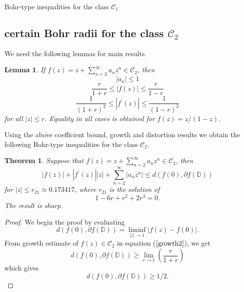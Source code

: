 \documentclass[12pt,a4paper,reqno]{amsart}
\theoremstyle{definition}
\theoremstyle{plain}
\newtheorem{theorem}[definition]{Theorem}
\newtheorem{lemma}[definition]{Lemma}
\numberwithin{equation}{section}
\begin{document}
\begin{section}{Bohr-type inequalities for the class $\mathcal{C}_1$}
\section{certain Bohr radii for the class $\mathcal{C}_2$}
\noindent
We need the following lemmas for main results.
\begin{lemma} {\cite{Sil1972}}
If $f(z)= z + \sum_{n=2}^{\infty} a_n z^n \in \mathcal{C}_2$, then
\begin{equation}\label{coef2}
 |a_n| \le 1
\end{equation}
\begin{equation}\label{growth2}
\frac{r}{1+r}  \le |f(z)| \le \frac{r}{1-r}
\end{equation}
\begin{equation}\label{distortion2}
\frac{1}{(1+r)^2} \le |f^{'}(z)| \le \frac{1}{(1-r)^2}
\end{equation}
for all $|z| \le r$. Equality in all cases is obtained for $f(z)=z/(1-z)$.
\end{lemma}
\noindent
Using the above coefficient bound, growth and distortion results we obtain the following Bohr-type inequalities for the class $\mathcal{C}_2$.
\begin{theorem}\label{th1}
Suppose that $f(z)=z + \sum_{n=2}^{\infty} a_n z^n \in \mathcal{C}_2$, then
\begin{equation}\label{2.2.1}
|f(z)| + |f^{'}(z)||z| + \sum_{n=2}^{\infty} |a_n z^n| \le d( f(0), \partial{f(\mathbb{D})})
\end{equation}
for $|z| \le r_{21}\simeq 0.173417$, where $r_{21}$ is the solution of
\begin{equation*}
    1-6 r+r^2+2 r^3 =0.
\end{equation*}
The result is sharp.
\end{theorem}
\begin{proof}
We begin the proof by evaluating
\begin{equation*}
d(f(0), \partial{f(\mathbb{D})})= \liminf \limits_{|z| \rightarrow 1} |f(z)-f(0)|.
\end{equation*}
From growth estimate of $f(z) \in \mathcal{C}_2$ in equation ($\ref{growth2}$), we get
\begin{equation*}
d(f(0), \partial{f(\mathbb{D})}) \ge \lim \limits_{r \rightarrow 1} \left(\frac{r}{1+r}\right)
\end{equation*}
which gives
\begin{equation}\label{eq9}
d(f(0), \partial{f(\mathbb{D})}) \ge 1/2.
\end{equation}
\noindent

\end{proof}
\end{section}
\end{document}
